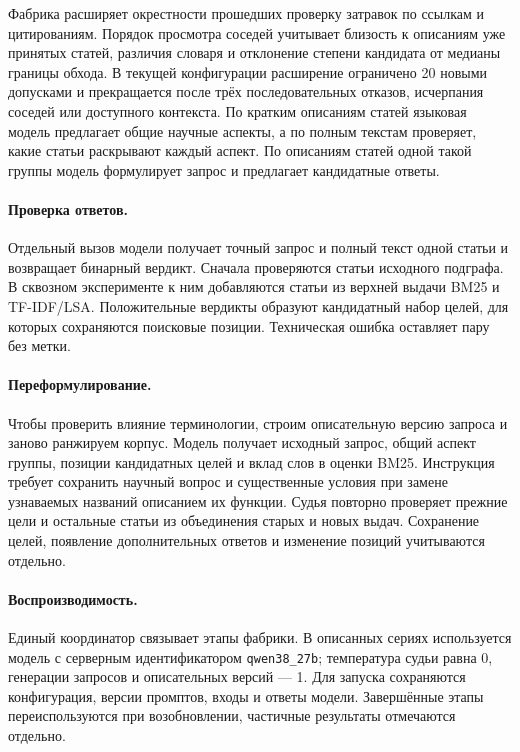 Фабрика расширяет окрестности прошедших проверку затравок по ссылкам и цитированиям. Порядок просмотра соседей учитывает близость к описаниям уже принятых статей, различия словаря и отклонение степени кандидата от медианы границы обхода. В текущей конфигурации расширение ограничено 20 новыми допусками и прекращается после трёх последовательных отказов, исчерпания соседей или доступного контекста. По кратким описаниям статей языковая модель предлагает общие научные аспекты, а по полным текстам проверяет, какие статьи раскрывают каждый аспект. По описаниям статей одной такой группы модель формулирует запрос и предлагает кандидатные ответы.

\paragraph{Проверка ответов.}
Отдельный вызов модели получает точный запрос и полный текст одной статьи и возвращает бинарный вердикт. Сначала проверяются статьи исходного подграфа. В сквозном эксперименте к ним добавляются статьи из верхней выдачи BM25 и TF-IDF/LSA. Положительные вердикты образуют кандидатный набор целей, для которых сохраняются поисковые позиции. Техническая ошибка оставляет пару без метки.

\paragraph{Переформулирование.}
Чтобы проверить влияние терминологии, строим описательную версию запроса и заново ранжируем корпус. Модель получает исходный запрос, общий аспект группы, позиции кандидатных целей и вклад слов в оценки BM25. Инструкция требует сохранить научный вопрос и существенные условия при замене узнаваемых названий описанием их функции. Судья повторно проверяет прежние цели и остальные статьи из объединения старых и новых выдач. Сохранение целей, появление дополнительных ответов и изменение позиций учитываются отдельно.

\paragraph{Воспроизводимость.}
Единый координатор связывает этапы фабрики. В описанных сериях используется модель с серверным идентификатором \texttt{qwen38\_27b}; температура судьи равна 0, генерации запросов и описательных версий --- 1. Для запуска сохраняются конфигурация, версии промптов, входы и ответы модели. Завершённые этапы переиспользуются при возобновлении, частичные результаты отмечаются отдельно.

